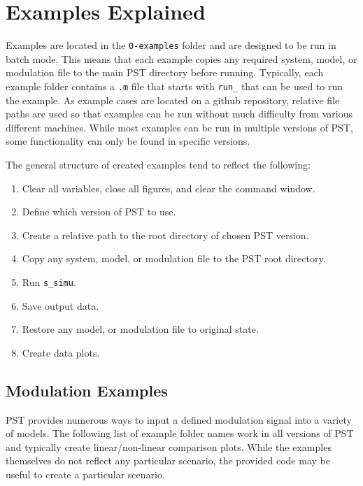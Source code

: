 \chapter{Examples Explained}
Examples are located in the \verb|0-examples| folder and are designed to be run in batch mode.
This means that each example copies any required system, model, or modulation file to the main PST directory before running.
Typically, each example folder contains a \verb|.m| file that starts with \verb|run_| that can be used to run the example.
As example cases are located on a github repository, relative file paths are used so that examples can be run without much difficulty from various different machines.
While most examples can be run in multiple versions of PST, some functionality can only be found in specific versions.

\noindent The general structure of created examples tend to reflect the following:
\begin{enumerate}
\itemsep 0em
\item Clear all variables, close all figures, and clear the command window.
\item Define which version of PST to use.
\item Create a relative path to the root directory of chosen PST version.
\item Copy any system, model, or modulation file to the PST root directory.
\item Run \verb|s_simu|.
\item Save output data.
\item Restore any model, or modulation file to original state.
\item Create data plots.
\end{enumerate}




\section{Modulation Examples} \label{sec: modExamples}
PST provides numerous ways to input a defined modulation signal into a variety of models.
The following list of example folder names work in all versions of PST and typically create linear/non-linear comparison plots.
While the examples themselves do not reflect any particular scenario, the provided code may be useful to create a particular scenario.

